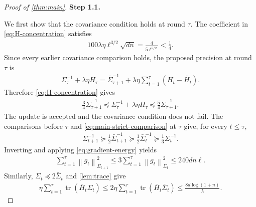 \documentclass{article}
\newcommand{\proofstepinline}[1]{%
    {\normalfont\normalsize\bfseries\color{blue!55!black}Step #1.}\enspace
}
\newcommand{\tr}{\operatorname{tr}}
\newcommand{\1}{\mathbf 1}
\newcommand{\normm}[2]{\left\lVert #1\right\rVert_{#2}}
\begin{document}
\begin{proof}[Proof of \cref{thm:main}]
    \proofstepinline{1.1}
    We first show that the covariance condition holds at round $\tau$.
    The coefficient in \eqref{eq:H-concentration} satisfies
    \begin{align}
        100\lambda\eta\ell^{3/2}\sqrt{dn}
        =\frac{4}{5\ell^{5/2}}<\frac14.
        \label{eq:main-stability-H-small}
    \end{align}
    Since every earlier covariance comparison holds, the proposed
    precision at round $\tau$ is
    \begin{align}
        \Sigma_\tau^{-1}+\lambda\eta H_\tau
        =\bar{\Sigma}_{\tau+1}^{-1}
        +\lambda\eta\sum_{t=1}^\tau(H_t-\bar{H}_t).
    \end{align}
    Therefore \eqref{eq:H-concentration} gives
    \begin{align}
        \frac34\bar{\Sigma}_{\tau+1}^{-1}
        \preceq
        \Sigma_\tau^{-1}+\lambda\eta H_\tau
        \preceq\frac54\bar{\Sigma}_{\tau+1}^{-1}.
        \label{eq:main-strict-comparison}
    \end{align}
    The update is accepted and the covariance condition does not fail.
    The comparisons before $\tau$ and \eqref{eq:main-strict-comparison}
    at $\tau$ give, for every $t\leq\tau$,
    \begin{align}
        \Sigma_{t+1}^{-1}
        \succeq\frac12\bar{\Sigma}_{t+1}^{-1}
        \succeq\frac12\bar{\Sigma}_t^{-1}
        \succeq\frac13\Sigma_t^{-1}.
    \end{align}
    Inverting and applying \eqref{eq:gradient-energy} yields
    \begin{align}
        \sum_{t=1}^\tau\normm{g_t}{\Sigma_{t+1}}^2
        \leq3\sum_{t=1}^\tau\normm{g_t}{\Sigma_t}^2
        \leq240dn\ell.
        \label{eq:main-next-gradient-energy}
    \end{align}
    Similarly, $\Sigma_t\preceq2\bar{\Sigma}_t$ and
    \cref{lem:trace} give
    \begin{align}
        \eta\sum_{t=1}^\tau\tr(\bar{H}_t\Sigma_t)
        \leq2\eta\sum_{t=1}^\tau\tr(\bar{H}_t\bar{\Sigma}_t)
        \leq\frac{8d\log(1+n)}{\lambda}.
        \label{eq:main-stability-trace}
    \end{align}


\end{proof}
\end{document}
